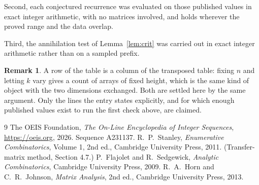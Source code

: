 \documentclass[11pt,a4paper]{article}
\theoremstyle{plain}
\theoremstyle{definition}
\newtheorem{remark}[theorem]{Remark}
\begin{document}
Second, each conjectured recurrence was evaluated on those published values in exact
integer arithmetic, with no matrices involved, and holds wherever the proved range and the
data overlap.

Third, the annihilation test of Lemma~\ref{lem:crit} was carried out in exact integer
arithmetic rather than on a sampled prefix.

\begin{remark}
A row of the table is a column of the transposed table: fixing $n$ and letting $k$ vary gives a
count of arrays of fixed height, which is the same kind of object with the two dimensions
exchanged. Both are settled here by the same argument. Only the lines the entry states
explicitly, and for which enough published values exist to run the first check above, are
claimed.
\end{remark}

\begin{thebibliography}{9}
 The OEIS Foundation, \emph{The On-Line Encyclopedia of Integer
Sequences}, \url{https://oeis.org}, 2026. Sequence A231137.
 R.~P.~Stanley, \emph{Enumerative Combinatorics}, Volume 1, 2nd ed.,
Cambridge University Press, 2011. (Transfer-matrix method, Section 4.7.)
 P.~Flajolet and R.~Sedgewick, \emph{Analytic Combinatorics}, Cambridge
University Press, 2009.
 R.~A.~Horn and C.~R.~Johnson, \emph{Matrix Analysis}, 2nd ed., Cambridge
University Press, 2013.
\end{thebibliography}
\end{document}

